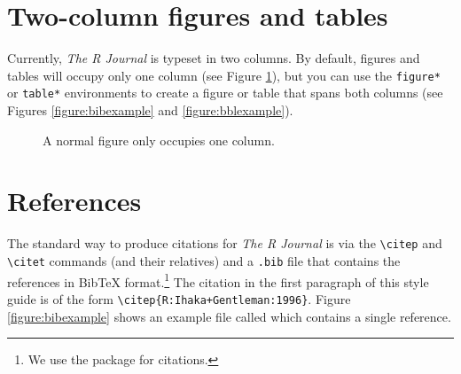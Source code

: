 %

\section{Two-column figures and tables}

Currently, \emph{The R Journal} is typeset in two columns.
By default, figures and tables will occupy only one
column (see Figure \ref{figure:onecolfig}),
but you can use the \verb|figure*| or
\verb|table*| environments to create a figure or
table that spans both columns (see Figures \ref{figure:bibexample}
and \ref{figure:bblexample}).

\begin{figure}
\vspace*{.1in}
\caption{\label{figure:onecolfig}
A normal figure only occupies one column.}
\end{figure}

\section{References}

The standard way to produce citations for \emph{The R Journal} is via the
\verb|\citep| and \verb|\citet| commands (and their relatives)
and a {\tt .bib} file that contains the
references in {\sc Bib}\TeX{} format.\footnote{We use the 
package for citations.}  The citation in the first
paragraph of this style guide is of the form
\verb|\citep{R:Ihaka+Gentleman:1996}|.  Figure \ref{figure:bibexample}
shows an example file called  which contains
a single reference.

